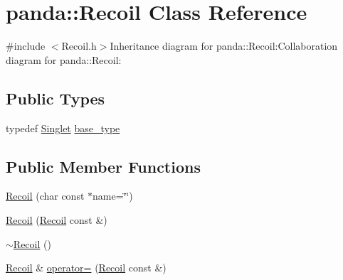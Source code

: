 \hypertarget{classpanda_1_1Recoil}{
\section{panda::Recoil Class Reference}
\label{classpanda_1_1Recoil}
}


{\ttfamily \#include $<$Recoil.h$>$}Inheritance diagram for panda::Recoil:Collaboration diagram for panda::Recoil:\subsection*{Public Types}
\begin{DoxyCompactItemize}
\item 
typedef \hyperlink{classpanda_1_1Singlet}{Singlet} \hyperlink{classpanda_1_1Recoil_ab6016b3cfb0efc204a7eb40394e67442}{base\_\-type}
\end{DoxyCompactItemize}
\subsection*{Public Member Functions}
\begin{DoxyCompactItemize}
\item 
\hyperlink{classpanda_1_1Recoil_ae38679b784d64ddfffc1027994f856ac}{Recoil} (char const $\ast$name=\char`\"{}\char`\"{})
\item 
\hyperlink{classpanda_1_1Recoil_af28e5fecb3cb7a4b8f0599d34cb5733c}{Recoil} (\hyperlink{classpanda_1_1Recoil}{Recoil} const \&)
\item 
\hyperlink{classpanda_1_1Recoil_a17606ae5f7e5fa468ca67ba597d734aa}{$\sim$Recoil} ()
\item 
\hyperlink{classpanda_1_1Recoil}{Recoil} \& \hyperlink{classpanda_1_1Recoil_a4915faccef273487495e3ec4a0c8176a}{operator=} (\hyperlink{classpanda_1_1Recoil}{Recoil} const \&)
\end{DoxyCompactItemize}
